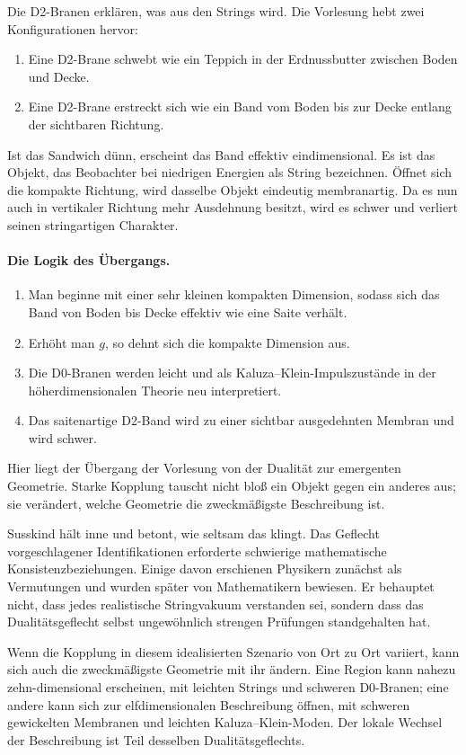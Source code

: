Die D2-Branen erklären, was aus den Strings wird. Die Vorlesung hebt zwei Konfigurationen hervor:
\begin{enumerate}
\item Eine D2-Brane schwebt wie ein Teppich in der Erdnussbutter zwischen Boden und Decke.
\item Eine D2-Brane erstreckt sich wie ein Band vom Boden bis zur Decke entlang der sichtbaren Richtung.
\end{enumerate}
Ist das Sandwich dünn, erscheint das Band effektiv eindimensional. Es ist das Objekt, das Beobachter bei niedrigen Energien als String bezeichnen. Öffnet sich die kompakte Richtung, wird dasselbe Objekt eindeutig membranartig. Da es nun auch in vertikaler Richtung mehr Ausdehnung besitzt, wird es schwer und verliert seinen stringartigen Charakter.

\paragraph{Die Logik des Übergangs.}
\begin{enumerate}
\item Man beginne mit einer sehr kleinen kompakten Dimension, sodass sich das Band von Boden bis Decke effektiv wie eine Saite verhält.
\item Erhöht man \(g\), so dehnt sich die kompakte Dimension aus.
\item Die D0-Branen werden leicht und als Kaluza--Klein-Impulszustände in der höherdimensionalen Theorie neu interpretiert.
\item Das saitenartige D2-Band wird zu einer sichtbar ausgedehnten Membran und wird schwer.
\end{enumerate}
Hier liegt der Übergang der Vorlesung von der Dualität zur emergenten Geometrie. Starke Kopplung tauscht nicht bloß ein Objekt gegen ein anderes aus; sie verändert, welche Geometrie die zweckmäßigste Beschreibung ist.

Susskind hält inne und betont, wie seltsam das klingt. Das Geflecht vorgeschlagener Identifikationen erforderte schwierige mathematische Konsistenzbeziehungen. Einige davon erschienen Physikern zunächst als Vermutungen und wurden später von Mathematikern bewiesen. Er behauptet nicht, dass jedes realistische Stringvakuum verstanden sei, sondern dass das Dualitätsgeflecht selbst ungewöhnlich strengen Prüfungen standgehalten hat.

Wenn die Kopplung in diesem idealisierten Szenario von Ort zu Ort variiert, kann sich auch die zweckmäßigste Geometrie mit ihr ändern. Eine Region kann nahezu zehn-dimensional erscheinen, mit leichten Strings und schweren D0-Branen; eine andere kann sich zur elfdimensionalen Beschreibung öffnen, mit schweren gewickelten Membranen und leichten Kaluza--Klein-Moden. Der lokale Wechsel der Beschreibung ist Teil desselben Dualitätsgeflechts.

